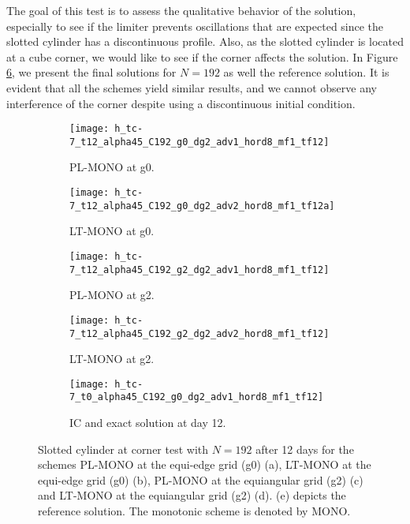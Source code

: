 The goal of this test is to assess the qualitative behavior of the solution, 
especially to see if the limiter prevents oscillations that are expected since the slotted cylinder has a discontinuous profile.
Also, as the slotted cylinder is located at a cube corner, we would like to see if the corner affects the solution.
In Figure \ref{chp-advcs-sec-exp-adv7}, we present the final solutions for $N=192$ as well the reference solution.
It is evident that all the schemes yield similar results, and we cannot observe any interference of the corner despite using a discontinuous initial condition.

\begin{figure}[!htb]
	\centering
	\begin{subfigure}{0.3\textwidth}
		\centering
		\texttt{[image: h\_tc-7\_t12\_alpha45\_C192\_g0\_dg2\_adv1\_hord8\_mf1\_tf12]}
		\caption{PL-MONO at g0.\label{chp-advcs-sec-exp-adv7-b}}
	\end{subfigure}
	\begin{subfigure}{0.3\textwidth}
		\centering
		\texttt{[image: h\_tc-7\_t12\_alpha45\_C192\_g0\_dg2\_adv2\_hord8\_mf1\_tf12a]}
		\caption{LT-MONO at g0.\label{chp-advcs-sec-exp-adv7-c}}
	\end{subfigure}
	
	\begin{subfigure}{0.3\textwidth}
		\centering
		\texttt{[image: h\_tc-7\_t12\_alpha45\_C192\_g2\_dg2\_adv1\_hord8\_mf1\_tf12]}
		\caption{PL-MONO at g2.\label{chp-advcs-sec-exp-adv7-d}}
	\end{subfigure}
	\begin{subfigure}{0.3\textwidth}
	\centering
	\texttt{[image: h\_tc-7\_t12\_alpha45\_C192\_g2\_dg2\_adv2\_hord8\_mf1\_tf12]}
	\caption{LT-MONO at g2.\label{chp-advcs-sec-exp-adv7-e}}
    \end{subfigure}

	\begin{subfigure}{0.3\textwidth}
	\centering
	\texttt{[image: h\_tc-7\_t0\_alpha45\_C192\_g0\_dg2\_adv1\_hord8\_mf1\_tf12]}
	\caption{IC and exact solution at day 12.\label{chp-advcs-sec-exp-adv7-a}}
    \end{subfigure}
	\caption{Slotted cylinder at corner test with $N=192$ after 12 days for the schemes 
	PL-MONO at the equi-edge grid (g0) (a),	LT-MONO at the equi-edge grid (g0) (b), 
	PL-MONO at the equiangular grid (g2) (c) and LT-MONO at the equiangular grid (g2) (d).
	(e) depicts the reference solution. The monotonic scheme is denoted by MONO.
	\label{chp-advcs-sec-exp-adv7}}
\end{figure}


